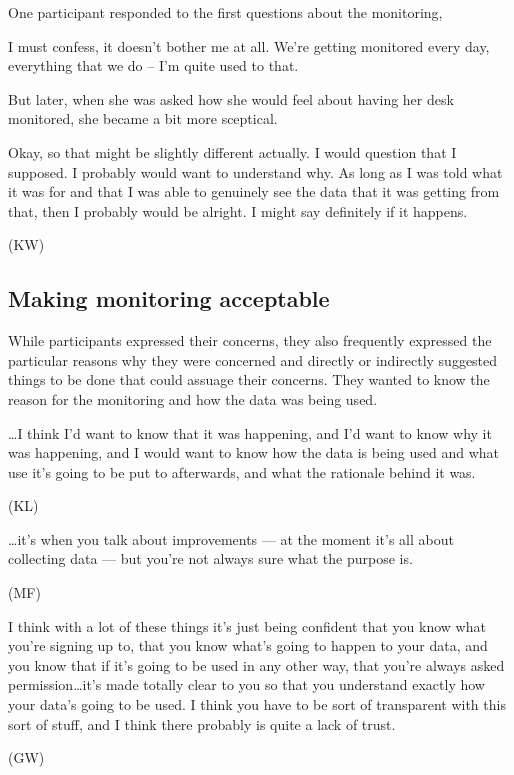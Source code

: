 One participant responded to the first questions about the monitoring, 

\begin{qt}I must confess, it doesn’t bother me at all. We’re getting monitored
every day, everything that we do – I’m quite used to that.\end{qt} 

But later,
when she was asked how she would feel about having her desk monitored,
she became a bit more sceptical. 

\begin{qt}Okay, so that might be slightly
different actually. I would question that I supposed. I probably would
want to understand why. As long as I was told what it was for and that
I was able to genuinely see the data that it was getting from that,
then I probably would be alright. I might say definitely if it
happens.\end{qt} (KW)

\subsection{Making monitoring acceptable}
\label{sec:making-monit-accept}

While participants expressed their concerns, they also frequently
expressed the particular reasons why they were concerned and directly
or indirectly suggested things to be done that could assuage their
concerns. They wanted to know the reason for the monitoring and how
the data was being used.

\begin{qt} \ldots I think I’d want to know
that it was happening, and I’d want to know why it was happening, and
I would want to know how the data is being used and what use it’s
going to be put to afterwards, and what the rationale behind it was.\end{qt}
(KL)

\begin{qt}\ldots it’s when you talk about improvements --- at the moment it’s all
about collecting data --- but you’re not always sure what the purpose
is.\end{qt} (MF)

\begin{qt}I think with a lot of these things it’s just being confident that you
know what you’re signing up to, that you know what’s going to happen
to your data, and you know that if it’s going to be used in any other
way, that you’re always asked permission\ldots it’s made totally clear to
you so that you understand exactly how your data’s going to be used. I
think you have to be sort of transparent with this sort of stuff, and
I think there probably is quite a lack of trust.\end{qt} (GW)

